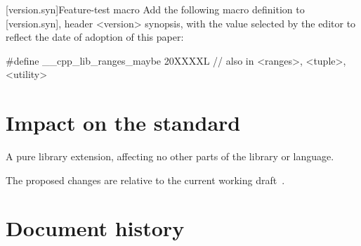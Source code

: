 \documentclass[a4paper,10pt,oneside,openany,final,article]{memoir}
\begin{document}
\begin{wording}
[version.syn]{Feature-test macro}
Add the following macro definition to [version.syn], header <version> synopsis, with the value selected by the editor to reflect the date of adoption of this paper:

\begin{codeblock}
  #define __cpp_lib_ranges_maybe 20XXXXL // also in <ranges>, <tuple>, <utility>
\end{codeblock}

\end{wording}

\chapter{Impact on the standard}

A pure library extension, affecting no other parts of the library or language.

The proposed changes are relative to the current working draft~\cite{N4958}.

\chapter*{Document history}
\end{document}
